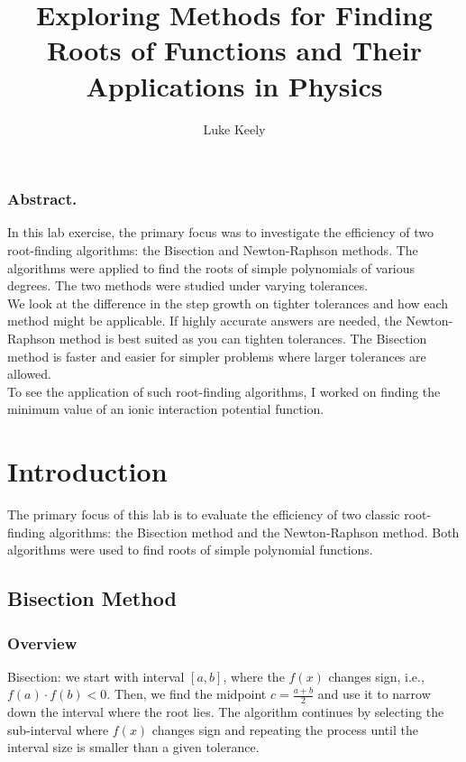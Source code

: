 \documentclass{llncs}
\numberwithin{figure}{section}
\begin{document}
\title{Exploring Methods for Finding Roots of Functions and Their Applications in Physics}
\author{Luke Keely}
\maketitle
\vspace{0.25\textheight}
\subsubsection{Abstract.}
In this lab exercise, the primary focus was to investigate the efficiency of two root-finding algorithms: the Bisection and Newton-Raphson methods. The algorithms were applied to find the roots of simple polynomials of various degrees. The two methods were studied under varying tolerances.\\
We look at the difference in the step growth on tighter tolerances and how each method might be applicable. If highly accurate answers are needed, the Newton-Raphson method is best suited as you can tighten tolerances. The Bisection method is faster and easier for simpler problems where larger tolerances are allowed.\\
To see the application of such root-finding algorithms, I worked on finding the minimum value of an ionic interaction potential function.
\restoregeometry
\newpage
\setcounter{tocdepth}{3}

\tableofcontents

\newpage

\section{Introduction}
The primary focus of this lab is to evaluate the efficiency of two classic root-finding algorithms: the Bisection method and the Newton-Raphson method. Both algorithms were used to find roots of simple polynomial functions.
\vspace{3em}
\subsection{Bisection Method}
\vspace{1em}
\subsubsection{Overview}
Bisection: we start with interval \([a, b]\), where the \(f(x)\) changes sign, i.e., \(f(a) \cdot f(b) < 0\). Then, we find the midpoint \(c = \frac{a+b}{2}\) and use it to narrow down the interval where the root lies. The algorithm continues by selecting the sub-interval where \(f(x)\) changes sign and repeating the process until the interval size is smaller than a given tolerance.
\end{document}
